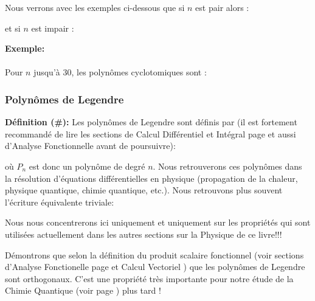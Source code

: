 	Nous verrons avec les exemples ci-dessous que si $n$ est pair alors :
	
	et si $n$ est impair :
	
	
	\pagebreak
	\begin{tcolorbox}[colframe=black,colback=white,sharp corners]
	\textbf{{\Large {}}Exemple:}\\\\
	Pour $n$ jusqu'à $30$, les polynômes cyclotomiques sont :
	
	\end{tcolorbox}
	
	\subsubsection{Polynômes de Legendre}\label{legendre polynomials}
	\textbf{Définition (\#\mydef):} Les polynômes de Legendre sont définis par (il est fortement recommandé de lire les sections de Calcul Différentiel et Intégral page \pageref{differential and integral calculus} et aussi d'Analyse Fonctionnelle \pageref{functional analysis} avant de poursuivre):
	
	où $P_n$ est donc un polynôme de degré $n$. Nous retrouverons ces polynômes dans la résolution d'équations différentielles en physique (propagation de la chaleur, physique quantique, chimie quantique, etc.). Nous retrouvons plus souvent l'écriture équivalente triviale:
	
	Nous nous concentrerons ici uniquement et uniquement sur les propriétés qui sont utilisées actuellement dans les autres sections sur la Physique de ce livre!!!
	
	Démontrons que selon la définition du produit scalaire fonctionnel (voir sections d'Analyse Fonctionelle page \pageref{functional dot product} et Calcul Vectoriel \pageref{dot product}) que les polynômes de Legendre sont orthogonaux. C'est une propriété très importante pour notre étude de la Chimie Quantique (voir page \pageref{quantum chemistry rigid rotator}) plus tard !
	
